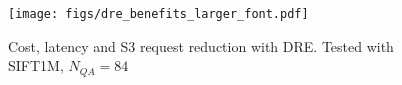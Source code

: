 \begin{figure}[h]%
\centering  
\texttt{[image: figs/dre\_benefits\_larger\_font.pdf]}
\caption{Cost, latency and S3 request reduction with DRE. Tested with SIFT1M, $N_{QA}=84$}
\label{fig:dre-benefits}
\end{figure}